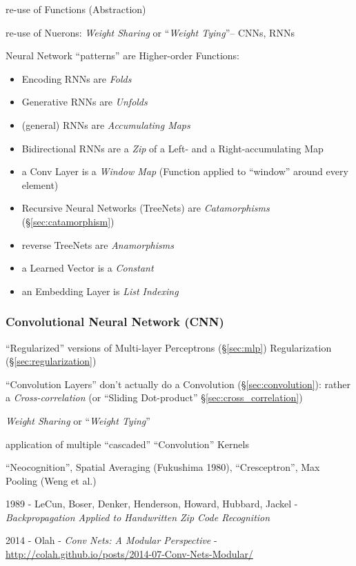 re-use of Functions (Abstraction)

re-use of Nuerons: \emph{Weight Sharing} or ``\emph{Weight Tying}''-- CNNs, RNNs

Neural Network ``patterns'' are Higher-order Functions:
\begin{itemize}
  \item Encoding RNNs are \emph{Folds}
  \item Generative RNNs are \emph{Unfolds}
  \item (general) RNNs are \emph{Accumulating Maps}
  \item Bidirectional RNNs are a \emph{Zip} of a Left- and a Right-accumulating
    Map
  \item a Conv Layer is a \emph{Window Map} (Function applied to ``window''
    around every element)
  \item Recursive Neural Networks (TreeNets) are \emph{Catamorphisms}
    (\S\ref{sec:catamorphism})
  \item reverse TreeNets are \emph{Anamorphisms}
  \item a Learned Vector is a \emph{Constant}
  \item an Embedding Layer is \emph{List Indexing}
\end{itemize}



\subsubsection{Convolutional Neural Network (CNN)}\label{sec:cnn}

``Regularized'' versions of Multi-layer Perceptrons (\S\ref{sec:mlp})
\fist Regularization (\S\ref{sec:regularization})

``Convolution Layers'' don't actually do a Convolution
(\S\ref{sec:convolution}):
rather a \emph{Cross-correlation} (or ``Sliding Dot-product''
\S\ref{sec:cross_correlation})

\emph{Weight Sharing} or ``\emph{Weight Tying}''

application of multiple ``cascaded'' ``Convolution'' Kernels

``Neocognition'', Spatial Averaging (Fukushima 1980), ``Cresceptron'', Max
Pooling (Weng et al.)

1989 - LeCun, Boser, Denker, Henderson, Howard, Hubbard, Jackel -
  \emph{Backpropagation Applied to Handwritten Zip Code Recognition}

2014 - Olah - \emph{Conv Nets: A Modular Perspective} -
  \url{http://colah.github.io/posts/2014-07-Conv-Nets-Modular/}

